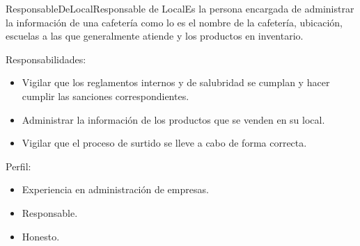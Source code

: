 \begin{Actor}{ResponsableDeLocal}{Responsable de Local}{Es la persona encargada de administrar la información de una cafetería como lo es el nombre de la cafetería, ubicación, escuelas a las que generalmente atiende y los productos en inventario.}
	
	\item[Responsabilidades:]\hspace{1pt}
		\begin{itemize}
			\item Vigilar que los reglamentos internos y de salubridad se cumplan y hacer cumplir las sanciones correspondientes.
			\item Administrar la información de los productos que se venden en su local.
			\item Vigilar que el proceso de surtido se lleve a cabo de forma correcta.
		\end{itemize}
	
	\item[Perfil:]\hspace{1pt}
		\begin{itemize}
			\item Experiencia en administración de empresas.
			\item Responsable.
			\item Honesto.
		\end{itemize}
	
\end{Actor}
		
